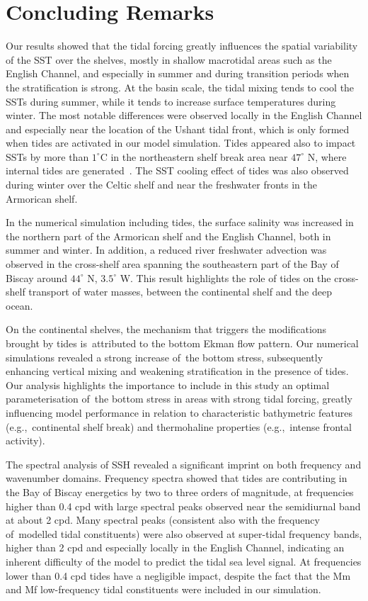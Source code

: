 \documentclass[jmse,article,accept,moreauthors,pdftex]{Definitions/mdpi}
\begin{document}
\section{Concluding Remarks}
\label{section:4}

Our results showed that the tidal forcing greatly influences the spatial variability of the SST over the shelves, mostly in shallow macrotidal areas such as the English Channel, and especially in summer and during transition periods when the stratification is strong. At the basin scale, the tidal mixing tends to cool the SSTs during summer, while it tends to increase surface temperatures during winter. The most notable differences were observed locally in the English Channel and especially near the location of the Ushant tidal front, which is only formed when tides are activated in our model simulation. Tides appeared also to impact SSTs by more than $1^\circ$C in the northeastern shelf break area near $47^\circ$ N, where internal tides are generated~\cite{Pairaud2010}. The SST cooling effect of tides was also observed during winter over the Celtic shelf and near the freshwater fronts in the Armorican shelf. 

In the numerical simulation including tides, the surface salinity was increased in the northern part of the Armorican shelf and the English Channel, both in summer and winter. In addition, a reduced river freshwater advection was observed in the cross-shelf area spanning the southeastern part of the Bay of Biscay around  $44^\circ$ N, $3.5^\circ$ W. This result highlights the role of tides on the cross-shelf transport of water masses, between the continental shelf and the deep ocean.

On the continental shelves, the mechanism that triggers the modifications brought by tides is~attributed to the bottom Ekman flow pattern. Our numerical simulations revealed a strong increase of~the bottom stress, subsequently enhancing vertical mixing and weakening stratification in the presence of tides. Our analysis highlights the importance to include in this study an optimal parameterisation of~the bottom stress in areas with strong tidal forcing, greatly influencing model performance in relation to characteristic bathymetric features (e.g.,~continental shelf break) and thermohaline properties (e.g.,~intense frontal activity).

The spectral analysis of SSH revealed a significant imprint on both frequency and wavenumber domains. Frequency spectra showed that tides are contributing in the Bay of Biscay energetics by two to three orders of magnitude, at frequencies higher than 0.4 cpd with large spectral peaks observed near the semidiurnal band at about 2 cpd. Many spectral peaks (consistent also with the frequency of~modelled tidal constituents) were also observed at super-tidal frequency bands, higher than 2 cpd and especially locally in the English Channel, indicating an inherent difficulty of the model to predict the tidal sea level signal. At frequencies lower than 0.4 cpd tides have a negligible impact, despite the fact that the Mm and Mf low-frequency tidal constituents were included in our simulation.
\end{document}
